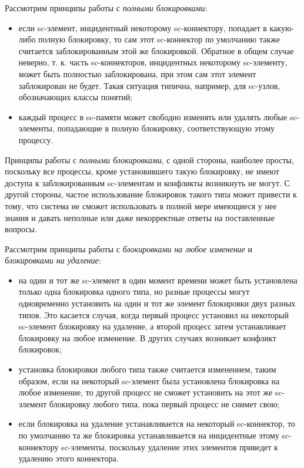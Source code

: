 Рассмотрим принципы работы с \textit{полными блокировками}:
\begin{itemize}
	\item если sc-элемент, инцидентный некоторому sc-коннектору, попадает в какую-либо полную блокировку, то сам этот sc-коннектор по умолчанию также считается заблокированным этой же блокировкой. Обратное в общем случае неверно, т. к. часть sc-коннекторов, инцидентных некоторому sc-элементу, может быть полностью заблокирована, при этом сам этот элемент заблокирован не будет. Такая ситуация типична, например, для sc-узлов, обозначающих классы понятий;
	\item каждый процесс в sc-памяти может свободно изменять или удалять любые sc-элементы, попадающие в полную блокировку, соответствующую этому процессу.
\end{itemize}

Принципы работы с \textit{полными блокировками}, с одной стороны, наиболее просты, поскольку все процессы, кроме установившего такую блокировку, не имеют доступа к заблокированным \mbox{sc-элементам} и конфликты возникнуть не могут. С другой стороны, частое использование блокировок такого типа может привести к тому, что система не сможет использовать в полной мере имеющиеся у нее знания и давать неполные или даже некорректные ответы на поставленные вопросы.

Рассмотрим принципы работы с \textit{блокировками на любое изменение} и \textit{блокировками на удаление}:
\begin{itemize}
	\item на один и тот же sc-элемент в один момент времени может быть установлена только одна блокировка одного типа, но разные процессы могут одновременно установить на один и тот же элемент блокировки двух разных типов. Это касается случая, когда первый процесс установил на некоторый sc-элемент блокировку на удаление, а второй процесс затем устанавливает блокировку на любое изменение. В других случаях возникает конфликт блокировок;
	\item установка блокировки любого типа также считается изменением, таким образом, если на некоторый \mbox{sc-элемент} была установлена блокировка на любое изменение, то другой процесс не сможет установить на этот же sc-элемент блокировку любого типа, пока первый процесс не снимет свою;
	\item если блокировка на удаление устанавливается на некоторый sc-коннектор, то по умолчанию та же блокировка устанавливается на инцидентные этому sc-коннектору sc-элементы, поскольку удаление этих элементов приведет к удалению этого коннектора.
\end{itemize}

